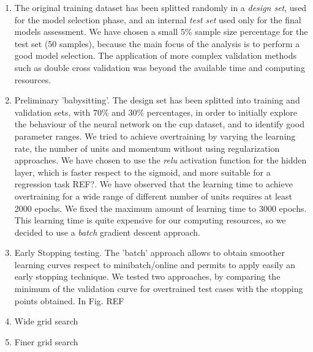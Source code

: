 \documentclass[11pt,twoside]{article}
\begin{document}
\begin{enumerate}
\item The original training dataset has been splitted randomly in a \textit{design set}, used for the model selection phase, and an internal \textit{test set} used only for the final models assessment.
  We have chosen a small $5\%$ sample size percentage for the test set (50 samples), because the main focus of the analysis is to perform a good model selection. The application of more complex validation methods such as double cross validation was beyond the available time and computing resources.
\item Preliminary 'babysitting'. The design set has been splitted into training and validation sets, with $70\%$ and $30\%$ percentages, in order to initially explore the behaviour of the neural network on the cup dataset, and to identify good parameter ranges. We tried to achieve overtraining by varying the learning rate, the number of units and momentum without using regularization approaches. We have chosen to use the \textit{relu} activation function for the hidden layer, which is faster respect to the sigmoid, and more suitable for a regression task REF?.
  We have observed that the learning time to achieve overtraining for a wide range of different number of units requires at least 2000 epochs. We fixed the maximum amount of learning time to 3000 epochs.
This learning time is quite expensive for our computing resources, so we decided to use a \textit{batch} gradient descent approach.

\item Early Stopping testing.
  The 'batch' approach allows to obtain smoother learning curves respect to minibatch/online and permits to apply easily an early stopping technique. We tested two approaches, by comparing the minimum of the validation curve for overtrained test cases with the stopping points obtained.
  In Fig. REF



  

\item Wide grid search


\item Finer grid search

  
  
\end{enumerate}





        

\end{document}
